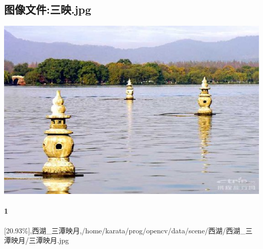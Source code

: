 \subsection{图像文件:三映.jpg}
\includegraphics[width=15cm,angle=0]{三映.jpg}

\paragraph{1}
[20.93\%],西湖\_三潭映月,/home/karata/prog/opencv/data/scene/西湖/西湖\_三潭映月/三潭映月.jpg

